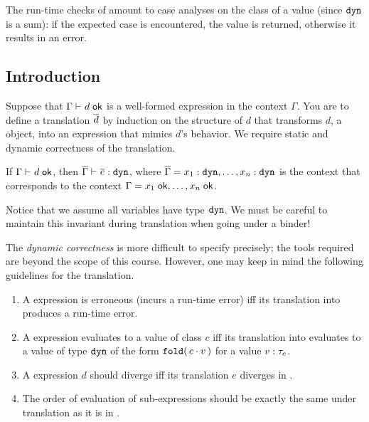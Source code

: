 \documentclass[11pt]{article}
\begin{document}
The run-time checks of \LangPyCF{} amount to case analyses on the class of a value
(since $\mathtt{dyn}$ is a sum): if the expected case is encountered, the value is
returned, otherwise it results in an error.

\subsection{Introduction}

Suppose that $\Gamma\vdash_{}{d}\;{\textsf{ok}}$ is a well-formed \LangPyCF{} expression in the \LangPyCF{} context $\Gamma$.
You are to define a translation $\overline{d}$ by induction on the structure of $d$ that transforms $d$, a \LangPyCF{} object, into an \LangFPC{} expression that mimics $d$'s behavior.
We require static and dynamic correctness of the translation.

\begin{theorem}\label{thm:static-correctness}
  If $\Gamma \vdash_{} {d}\;{\textsf{ok}}$, then
  $\overline{\Gamma} \vdash_{} \overline{e} : \mathtt{dyn}$, where
  $\overline{\Gamma} = {x_1}\mathrel{:}{\mathtt{dyn}},\dots,{x_n}\mathrel{:}{\mathtt{dyn}}$ is the \LangFPC{} context that corresponds to the \LangPyCF{} context $\Gamma={x_1}\;{\textsf{ok}},\dots,{x_n}\;{\textsf{ok}}$.
\end{theorem}

Notice that we assume all variables have type $\mathtt{dyn}$.
We must be careful to maintain this invariant during translation when going under a binder!

The \emph{dynamic correctness} is more difficult to specify precisely; the tools required are beyond
the scope of this course.  However, one may keep in mind the following guidelines for the translation.
\begin{enumerate}

\item A \LangPyCF{} expression is erroneous (incurs a run-time error) iff its translation into \LangFPC{} produces a run-time error.

\item A \LangPyCF{} expression evaluates to a value of class $c$ iff its translation into \LangFPC{} evaluates to a value of type $\mathtt{dyn}$ of the form ${\mathtt{fold}}\mathtt{(}\,{c}\mathbin{\cdot}{v}\,\mathtt{)}$ for a value ${v}\mathrel{:}{\tau_c}$.

\item A \LangPyCF{} expression $d$ should diverge iff its translation $e$ diverges in \LangFPC{}.

\item The order of evaluation of sub-expressions should be exactly the same under translation as it is in \LangPyCF{}.

\end{enumerate}
\end{document}
